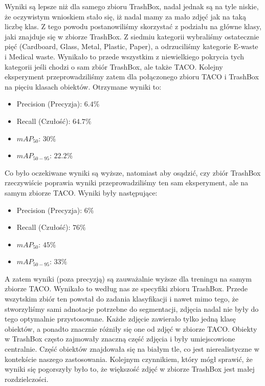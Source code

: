 \documentclass[licencjacka]{pracamgr}
\begin{document}
Wyniki są lepsze niż dla samego zbioru TrashBox, nadal jednak są na tyle niskie, że oczywistym wnioskiem stało się, iż nadal mamy za mało zdjęć jak na taką liczbę klas. Z tego powodu postanowiliśmy skorzystać z podziału na główne klasy, jaki znajduje się w zbiorze TrashBox. Z siedmiu kategorii wybraliśmy ostatecznie pięć (Cardboard, Glass, Metal, Plastic, Paper), a odrzuciliśmy kategorie E-waste i Medical waste. Wynikało to przede wszystkim z niewielkiego pokrycia tych kategorii jeśli chodzi o sam zbiór TrashBox, ale także TACO. 
Kolejny eksperyment przeprowadziliśmy zatem dla połączonego zbioru TACO i TrashBox na pięciu klasach obiektów. Otrzymane wyniki to:

\begin{itemize}
    \item Precision (Precyzja): $6.4\%$
    \item Recall (Czułość): $64.7\%$
    \item $mAP_{50}$: $30\%$
    \item $mAP_{50-95}$: $22.2\%$
\end{itemize}

Co było oczekiwane wyniki są wyższe, natomiast aby osądzić, czy zbiór TrashBox rzeczywiście poprawia wyniki przeprowadziliśmy ten sam eksperyment, ale na samym zbiorze TACO. Wyniki były następujące:

\begin{itemize}
    \item Precision (Precyzja): $6\%$
    \item Recall (Czułość): $76\%$
    \item $mAP_{50}$: $45\%$
    \item $mAP_{50-95}$: $33\%$
\end{itemize}

A zatem wyniki (poza precyzją) są zauważalnie wyższe dla treningu na samym zbiorze TACO. Wynikało to według nas ze specyfiki zbioru TrashBox. Przede wszytskim zbiór ten powstał do zadania klasyfikacji i nawet mimo tego, że stworzyliśmy sami adnotacje potrzebne do segmentacji, zdjęcia nadal nie były do tego optymalnie przystosowane. Każde zdjęcie zawierało tylko jedną klasę obiektów, a ponadto znacznie różniły się one od zdjęć w zbiorze TACO. Obiekty w TrashBox często zajmowały znaczną część zdjęcia i były umiejscowione centralnie. Część obiektów znajdowała się na białym tle, co jest nierealistyczne w kontekście naszego zastosowania. Kolejnym czynnikiem, który mógł sprawić, że wyniki się pogorszyły było to, że większość zdjęć w zbiorze TrashBox jest małej rozdzielczości.
\end{document}
